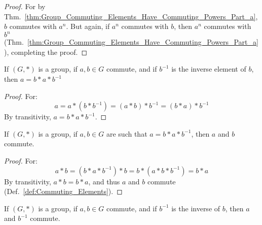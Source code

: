     \begin{proof}
        For by
        Thm.~\ref{thm:Group_Commuting_Elements_Have_Commuting_Powers_Part_a},
        $b$ commutes with $a^{n}$. But again, if $a^{n}$ commutes with
        $b$, then $a^{n}$ commutes with $b^{n}$
        (Thm.~\ref{thm:Group_Commuting_Elements_Have_Commuting_Powers_Part_a}),
        completing the proof.
    \end{proof}
    \begin{theorem}
        \label{thm:Group_Equiv_Def_of_Commute_a}%
        If $(G,*)$ is a group, if $a,b\in{G}$ commute, and if $b^{\minus{1}}$
        is the inverse element of $b$, then $a=b*a*b^{\minus{1}}$
    \end{theorem}
    \begin{proof}
        For:
        \begin{equation}
            a=a*(b*b^{\minus{1}})
            =(a*b)*b^{\minus{1}}
            =(b*a)*b^{\minus{1}}
        \end{equation}
        By transitivity, $a=b*a*b^{\minus{1}}$.
    \end{proof}
    \begin{theorem}
        \label{thm:Group_Equiv_Def_of_Commute_b}%
        If $(G,*)$ is a group, if $a,b\in{G}$ are such that
        $a=b*a*b^{\minus{1}}$, then $a$ and $b$ commute.
    \end{theorem}
    \begin{proof}
        For:
        \begin{equation}
            a*b=(b*a*b^{\minus{1}})*b
            =b*(a*b*b^{\minus{1}})
            =b*a
        \end{equation}
        By transitivity, $a*b=b*a$, and thus $a$ and $b$ commute
        (Def.~\ref{def:Commuting_Elements}).
    \end{proof}
    \begin{theorem}
        \label{thm:Group_Commuting_Elements_Commute_with_Inverses}%
        If $(G,*)$ is a group, if $a,b\in{G}$ commute, and if $b^{\minus{1}}$ is
        the inverse of $b$, then $a$ and $b^{\minus{1}}$ commute.
    \end{theorem}
